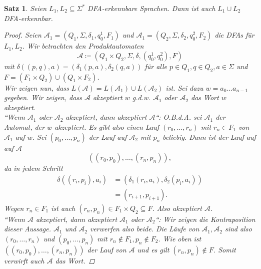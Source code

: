 \documentclass[11pt, a4paper]{article}
\theoremstyle{definition}
\theoremstyle{plain}
\newtheorem{theorem}[definition]{Satz}
\numberwithin{equation}{section}
\begin{document}
\begin{theorem}\label{thm:regular_union}
	Seien \( L_1, L_2 \subseteq \Sigma^\ast \) DFA-erkennbare Sprachen. Dann ist auch \( L_1 \cup L_2 \) DFA-erkennbar.
	\begin{proof}
		Seien \( \mathcal{A}_1 = (Q_1, \Sigma, \delta_1, q_0^1, F_1) \) und \( \mathcal{A}_1 = (Q_2, \Sigma, \delta_2, q_0^2, F_2) \) die DFAs für \( L_1, L_2 \). Wir betrachten den \textit{Produktautomaten}
		\[
			\mathcal{A} \coloneqq (Q_1 \times Q_2, \Sigma, \delta, (q_0^1, q_0^2), F)
		\]
		mit \( \delta((p, q), a) = (\delta_1(p, a), \delta_2(q, a)) \) für alle \( p \in Q_1, q \in Q_2, a \in \Sigma \) und \( F = (F_1 \times Q_2) \cup (Q_1 \times F_2) \).\\
		Wir zeigen nun, dass \( L(\mathcal{A}) = L(\mathcal{A}_1) \cup L(\mathcal{A}_2) \) ist.
		Sei dazu \( w = a_0 \ldots a_{n-1} \) gegeben. Wir zeigen, dass \( \mathcal{A} \) akzeptiert \( w \) {g.d.w.} \( \mathcal{A}_1 \) oder \( \mathcal{A}_2 \) das Wort \( w \) akzeptiert.\\
		``Wenn \( \mathcal{A}_1 \) oder \( \mathcal{A}_2 \) akzeptiert, dann akzeptiert \( \mathcal{A} \)``:
		{O.B.d.A.} sei \( \mathcal{A}_1 \) der Automat, der \( w \) akzeptiert. Es gibt also einen Lauf \( (r_0, \ldots, r_n) \) mit \( r_n \in F_1 \) von \( \mathcal{A}_1 \) auf \( w \). Sei \( (p_0, \ldots, p_n) \) der Lauf auf \( \mathcal{A}_2 \) mit \( p_n \) beliebig. Dann ist der Lauf auf auf \( \mathcal{A} \)
		\[
			((r_0, p_0), \ldots, (r_n, p_n)),
		\]
		da in jedem Schritt 
		\begin{align*}
			\delta((r_i, p_i), a_i) &= (\delta_1(r_i, a_i), \delta_2(p_i, a_i)) \\
			&= (r_{i+1}, p_{i+1}).
		\end{align*}
		Wegen \( r_n \in F_1 \) ist auch \( (r_n, p_n) \in F_1 \times Q_2 \subseteq F \). Also akzeptiert \( \mathcal{A} \).\\
		``Wenn \( \mathcal{A} \) akzeptiert, dann akzeptiert \( \mathcal{A}_1 \) oder \( \mathcal{A}_2 \)``:
		Wir zeigen die Kontraposition dieser Aussage. \( \mathcal{A}_1 \) und \( \mathcal{A}_2 \) verwerfen also beide. Die Läufe von \( \mathcal{A}_1, \mathcal{A}_2 \) sind also \( (r_0, \ldots, r_n) \) und \( (p_0, \ldots, p_n) \) mit \( r_n \notin F_1, p_n \notin F_2 \). Wie oben ist \( ((r_0, p_0), \ldots, (r_n, p_n)) \) der Lauf von \( \mathcal{A} \) und es gilt \( (r_n, p_n) \notin F \). Somit verwirft auch \( \mathcal{A} \) das Wort.
	\end{proof}
\end{theorem}
\end{document}
